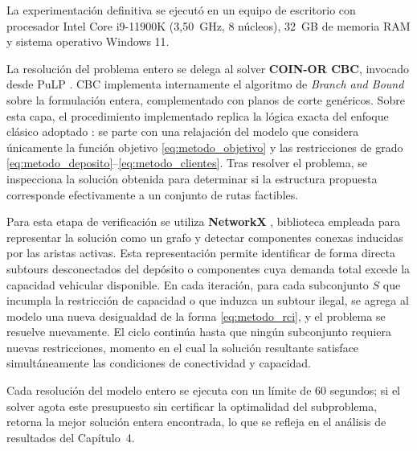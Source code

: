 La experimentación definitiva se ejecutó en un equipo de escritorio con
procesador Intel Core i9-11900K (3{,}50~GHz, 8 núcleos), 32~GB de memoria RAM
y sistema operativo Windows 11.


La resolución del problema entero se delega al solver \textbf{COIN-OR CBC},
invocado desde PuLP \parencite{pulp2011}. CBC implementa internamente el algoritmo de
\textit{Branch and Bound} sobre la formulación entera, complementado con planos de
corte genéricos. Sobre esta capa, el procedimiento implementado replica la lógica
exacta del enfoque clásico adoptado \parencite{laporte1983branch}: se parte con una relajación del
modelo que considera únicamente la función objetivo \eqref{eq:metodo_objetivo} y las
restricciones de grado \eqref{eq:metodo_deposito}--\eqref{eq:metodo_clientes}. Tras
resolver el problema, se inspecciona la solución obtenida para determinar si la
estructura propuesta corresponde efectivamente a un conjunto de rutas factibles.

Para esta etapa de verificación se utiliza \textbf{NetworkX}
\parencite{hagberg2008exploring}, biblioteca empleada para representar la solución
como un grafo y detectar componentes conexas inducidas por las aristas activas. Esta
representación permite identificar de forma directa subtours desconectados del
depósito o componentes cuya demanda total excede la capacidad vehicular disponible. En
cada iteración, para cada subconjunto $S$ que incumpla la restricción de capacidad o
que induzca un subtour ilegal, se agrega al modelo una nueva desigualdad de la
forma \eqref{eq:metodo_rci}, y el problema se resuelve nuevamente. El ciclo continúa
hasta que ningún subconjunto requiera nuevas restricciones, momento en el cual la
solución resultante satisface simultáneamente las condiciones de conectividad y
capacidad.

Cada resolución del modelo entero se ejecuta con un límite de 60 segundos; si
el solver agota este presupuesto sin certificar la optimalidad del subproblema,
retorna la mejor solución entera encontrada, lo que se refleja en el análisis
de resultados del Capítulo~4.


